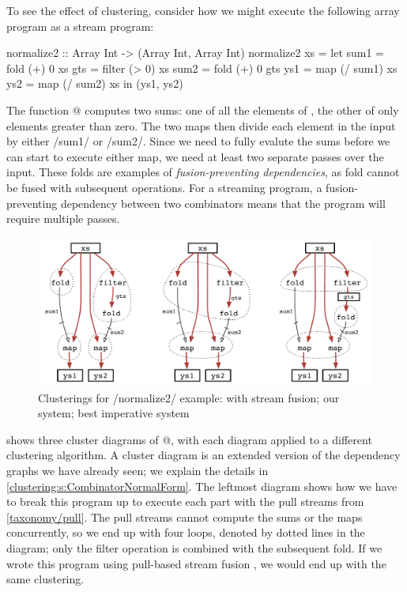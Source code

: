 To see the effect of clustering, consider how we might execute the following array program as a stream program:

\begin{haskell}
normalize2 :: Array Int -> (Array Int, Array Int)
normalize2 xs
 = let sum1 = fold   (+)  0   xs
       gts  = filter (>   0)  xs
       sum2 = fold   (+)  0   gts
       ys1  = map    (/ sum1) xs
       ys2  = map    (/ sum2) xs
   in (ys1, ys2)
\end{haskell}

The function @ computes two sums: one of all the elements of \Hs@xs@, the other of only elements greater than zero.
The two maps then divide each element in the input \Hs@xs@ by either \Hs/sum1/ or \Hs/sum2/.
Since we need to fully evalute the sums before we can start to execute either map, we need at least two separate passes over the input.
These folds are examples of \emph{fusion-preventing dependencies}, as fold cannot be fused with subsequent operations.
For a streaming program, a fusion-preventing dependency between two combinators means that the program will require multiple passes.

\begin{figure}
\begin{center}
\includegraphics[scale=0.5]{copy/03-body/clustering/figures/ex1-compare.pdf}
\end{center}
\caption{Clusterings for \Hs/normalize2/ example: with stream fusion; our system; best imperative system}
\label{clustering:f:normalize2-clusterings}
\end{figure}


 shows three cluster diagrams of @, with each diagram applied to a different clustering algorithm.
A cluster diagram is an extended version of the dependency graphs we have already seen; we explain the details in \cref{clustering:s:CombinatorNormalForm}.
The leftmost diagram shows how we have to break this program up to execute each part with the pull streams from \cref{taxonomy/pull}.
The pull streams cannot compute the sums or the maps concurrently, so we end up with four loops, denoted by dotted lines in the diagram; only the filter operation is combined with the subsequent fold.
If we wrote this program using pull-based stream fusion \citep{coutts2007stream}, we would end up with the same clustering.

